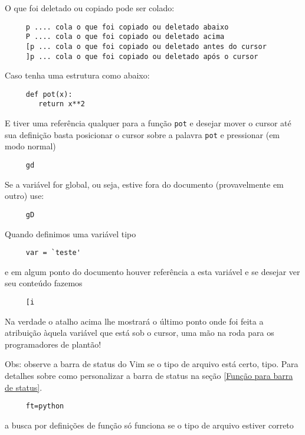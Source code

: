 O que foi deletado ou copiado pode ser colado:

\begin{verbatim}
     p .... cola o que foi copiado ou deletado abaixo
     P .... cola o que foi copiado ou deletado acima
     [p ... cola o que foi copiado ou deletado antes do cursor
     ]p ... cola o que foi copiado ou deletado após o cursor
\end{verbatim}

Caso tenha uma estrutura como abaixo:

\begin{verbatim}
     def pot(x):
        return x**2
\end{verbatim}

E tiver uma referência qualquer para a função \verb+pot+ e desejar
mover o cursor até sua definição basta posicionar o cursor sobre a palavra
\verb+pot+ e pressionar (em modo normal)

\begin{verbatim}
     gd
\end{verbatim}

Se a variável for global, ou seja, estive fora do documento
(provavelmente em outro) use:

\begin{verbatim}
     gD
\end{verbatim}

Quando definimos uma variável tipo

\begin{verbatim}
     var = `teste'
\end{verbatim}

e em algum ponto do documento houver referência a esta variável e se
desejar ver seu conteúdo fazemos

\begin{verbatim}
     [i
\end{verbatim}
Na verdade o atalho acima lhe mostrará o último ponto onde foi feita
a atribuição àquela variável que está sob o cursor, uma mão na roda
para os programadores de plantão!


Obs: observe a  barra de status do Vim se o tipo de arquivo está certo,
tipo. Para detalhes sobre como personalizar a barra de status na seção
\ref{Função para barra de status}.

\begin{verbatim}
     ft=python
\end{verbatim}

a busca por definições de função só funciona se o tipo de arquivo
estiver correto

